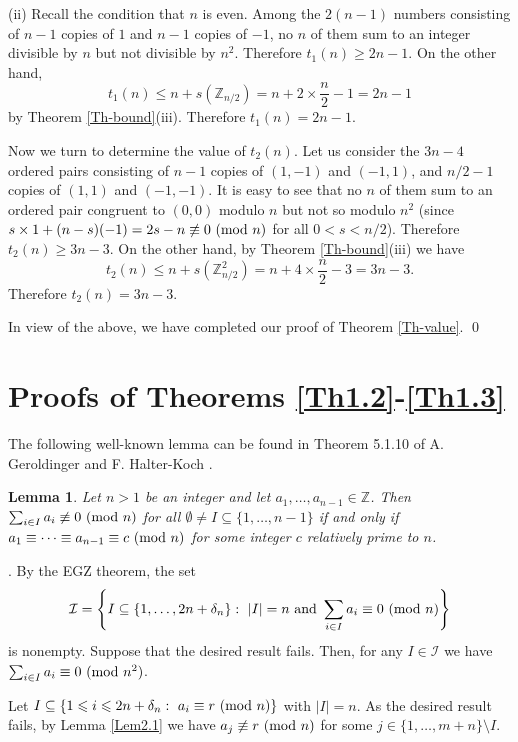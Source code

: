 \documentclass[11pt,reqno]{amsart}
\def\pmod #1{\ ({\rm{mod}}\ #1)}
\def\Z{\mathbb Z}
\def\l{\left}
\def\r{\right}
\def\t{\text}
\def\f{\frac}
\def\ls{\leqslant}
\def\gs{\geqslant}
\def\se {\subseteq}
\def\sm{\setminus}
\def\eq{\equiv}
\def\da{\delta}
\theoremstyle{plain}
\newtheorem{lemma}{Lemma}
\theoremstyle{definition}
\theoremstyle{remark}
\begin{document}
 (ii) Recall the condition that $n$ is even.
 Among the $2(n-1)$ numbers consisting of $n-1$ copies of $1$
and $n-1$ copies of $-1$, no $n$ of them sum to an integer divisible by $n$ but not divisible by $n^2$.
Therefore $t_1(n)\gs 2n-1$. On the other hand,
$$t_1(n)\ls n+s(\Z_{n/2})=n+2\times\f n2-1=2n-1$$ by Theorem \ref{Th-bound}(iii).
Therefore $t_1(n)=2n-1$.

Now we turn to determine the value of $t_2(n)$. Let us consider the $3n-4$ ordered pairs
consisting of $n-1$ copies of $(1,-1)$ and $(-1,1)$, and $n/2-1$ copies of $(1,1)$ and $(-1,-1)$.
It is easy to see that no $n$ of them sum to an ordered pair congruent to $(0,0)$ modulo $n$ but not so modulo $n^2$ (since $s\times1+(n-s)(-1)=2s-n\not\eq0\pmod n$ for all $0<s<n/2$).
Therefore $t_2(n)\gs 3n-3$. On the other hand, by Theorem \ref{Th-bound}(iii) we have
$$t_2(n)\ls n+s(\Z_{n/2}^2)=n+4\times\f n2-3=3n-3.$$
Therefore $t_2(n)=3n-3$. 

In view of the above, we have completed our proof of Theorem \ref{Th-value}. \qed


\section{Proofs of Theorems \ref{Th1.2}-\ref{Th1.3}}
\setcounter{lemma}{0}
\setcounter{theorem}{0}
\setcounter{corollary}{0}
\setcounter{remark}{0}
\setcounter{equation}{0}


The following well-known lemma can be found in Theorem 5.1.10 of A. Geroldinger and F. Halter-Koch \cite[p.\,309]{GH}.

\begin{lemma} \label{Lem2.2} Let $n>1$ be an integer and let $a_1,\ldots,a_{n-1}\in\Z$. Then
$\sum_{i\in I}a_i\not\eq0\pmod n$ for all $\emptyset\not= I\se\{1,\ldots,n-1\}$ if and only if
$a_1\eq\cdots\eq a_{n-1}\eq c\pmod n$ for some integer $c$ relatively prime to $n$.
\end{lemma}

 \medskip
 .  By the EGZ theorem, the set
 $${\mathcal I}=\l\{I\se\{1,\ldots,2n+\da_n\}:\ |I|=n\ \t{and}\ \sum_{i\in I}a_i\eq0\pmod n\r\}$$
 is nonempty. Suppose that the desired result fails. Then, for any $I\in{\mathcal I}$ we have
 $\sum_{i\in I}a_i\eq0\pmod{n^2}$.

 Let $I\se\{1\ls i\ls 2n+\da_n:\ a_i\eq r\pmod n\}$ with $|I|=n$.
 As the desired result fails, by Lemma \ref{Lem2.1}
 we have $a_j\not\eq r\pmod n$ for some $j\in\{1,\ldots,m+n\}\sm I$.
\end{document}
